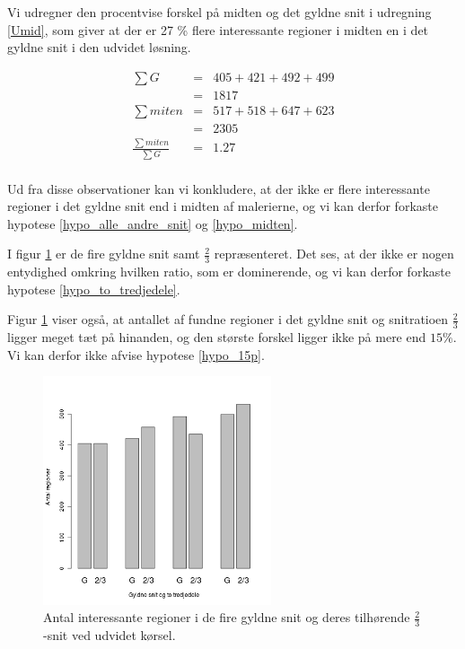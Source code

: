 {Vi udregner den procentvise forskel på midten og det gyldne snit i
udregning \ref{Umid}, som giver at der er 27 \% flere interessante
regioner i midten en i det gyldne snit i den udvidet løsning.

\begin{eqnarray}
\sum{G} &=& 405+421+492+499 \label{Umid}\\ \nonumber
			&=& 1817 \\\nonumber
\sum{miten} &=& 517+518+647+623 \\\nonumber
			&=& 2305 \\\nonumber
\frac{\sum{miten}}{\sum{G}} &=& 1.27  \\ \nonumber
\end{eqnarray}

Ud fra disse observationer kan vi konkludere, at der ikke er flere
interessante regioner i det gyldne snit end i midten af malerierne, og
vi kan derfor forkaste hypotese \ref{hypo_alle_andre_snit} og
\ref{hypo_midten}.

I figur \ref{G_vs_to_trejedele_udvidet} er de fire gyldne snit samt
$\frac{2}{3}$ repræsenteret. Det ses, at der ikke er nogen entydighed
omkring hvilken ratio, som er dominerende, og vi kan derfor forkaste hypotese
\ref{hypo_to_tredjedele}.

Figur \ref{G_vs_to_trejedele_udvidet} viser også, at antallet af fundne
regioner i det gyldne snit og snitratioen $\frac{2}{3}$ ligger meget
tæt på hinanden, og den største forskel ligger ikke på mere end $15\%$.
Vi kan derfor ikke afvise hypotese \ref{hypo_15p}.

\begin{figure}[h!]
	\begin{center}
		\includegraphics[width=0.6\textwidth]{afsnit/resultater/billeder/G_vs_to_tredjedeleU.png}
	\end{center}
    \caption{Antal interessante regioner i de fire gyldne snit og deres
    tilhørende $\frac{2}{3}$-snit ved udvidet kørsel.}
	\label{G_vs_to_trejedele_udvidet}
\end{figure}

}
